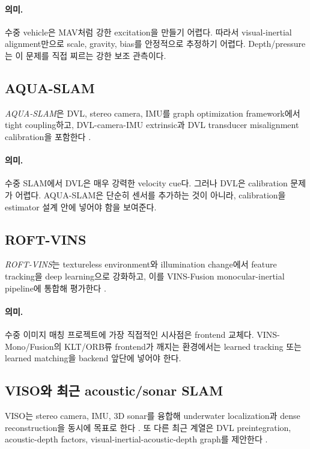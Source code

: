 \documentclass[11pt,a4paper]{article}
\newcommand{\paper}[1]{\textit{#1}}
\begin{document}
\paragraph{의미.}
수중 vehicle은 MAV처럼 강한 excitation을 만들기 어렵다.
따라서 visual-inertial alignment만으로 scale, gravity, bias를 안정적으로 추정하기 어렵다.
Depth/pressure는 이 문제를 직접 찌르는 강한 보조 관측이다.

\subsection{AQUA-SLAM}

\paper{AQUA-SLAM}은 DVL, stereo camera, IMU를 graph optimization framework에서 tight coupling하고, DVL-camera-IMU extrinsic과 DVL transducer misalignment calibration을 포함한다 \cite{xu2025aquaslam}.

\paragraph{의미.}
수중 SLAM에서 DVL은 매우 강력한 velocity cue다.
그러나 DVL은 calibration 문제가 어렵다.
AQUA-SLAM은 단순히 센서를 추가하는 것이 아니라, calibration을 estimator 설계 안에 넣어야 함을 보여준다.

\subsection{ROFT-VINS}

\paper{ROFT-VINS}는 textureless environment와 illumination change에서 feature tracking을 deep learning으로 강화하고, 이를 VINS-Fusion monocular-inertial pipeline에 통합해 평가한다 \cite{park2026roftvins}.

\paragraph{의미.}
수중 이미지 매칭 프로젝트에 가장 직접적인 시사점은 frontend 교체다.
VINS-Mono/Fusion의 KLT/ORB류 frontend가 깨지는 환경에서는 learned tracking 또는 learned matching을 backend 앞단에 넣어야 한다.

\subsection{VISO와 최근 acoustic/sonar SLAM}

VISO는 stereo camera, IMU, 3D sonar를 융합해 underwater localization과 dense reconstruction을 동시에 목표로 한다 \cite{liu2026viso}.
또 다른 최근 계열은 DVL preintegration, acoustic-depth factors, visual-inertial-acoustic-depth graph를 제안한다 \cite{zhang2025dvlpreintegration}.
\end{document}
